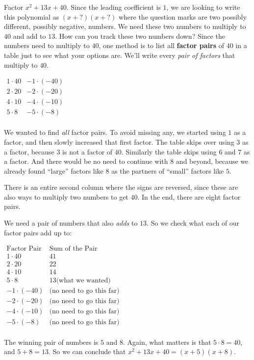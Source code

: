\documentclass{ximera}
\begin{document}
\begin{example}
       Factor $x^2+13x+40$.
        Since the leading coefficient is $1$,
        we are looking to write this polynomial as
        $(x+\mathord{?})(x+\mathord{?})$ where the question marks are two possibly different,
        possibly negative, numbers.
        We need these two numbers to multiply to $40$ and add to $13$.
        How can you track these two numbers down?
        Since the numbers need to multiply to $40$,
        one method is to list all \textbf{factor pairs}
        of $40$ in a table just to see what your options are.
        We'll write every \textit{pair of factors}
        that multiply to $40$.
\begin{center}
$
\begin{array}{cc}
           1\cdot40 & -1\cdot(-40) \\
          2\cdot20 & -2\cdot(-20) \\
         4\cdot10 & -4\cdot(-10)\\
        5\cdot8 &  -5\cdot(-8) \\
 \end{array}
$
\end{center}
        We wanted to find \textit{all} factor pairs.
        To avoid missing any, we started using $1$ as a factor,
        and then slowly increased that first factor.
        The table skips over using $3$ as a factor,
        because $3$ is not a factor of $40$.
        Similarly the table skips using $6$ and $7$ as a factor.
        And there would be no need to continue with $8$ and beyond,
        because we already found ``large''
        factors like $8$ as the partners of
        ``small'' factors like $5$.

   There is an entire second column where the signs are reversed,
        since these are also ways to multiply two numbers to get $40$.
        In the end, there are eight factor pairs.

        We need a pair of numbers that also \textit{adds} to $13$.
        So we check what each of our factor pairs add up to:
\begin{center}
$
\begin{array}{c|l}
      \text{Factor Pair} & \text{Sum of the Pair} \\
\hline
   1\cdot40 & 41 \\
     2\cdot20 & 22 \\
   4\cdot10 & 14 \\
        5\cdot8 & 13 \text{(what we wanted)} \\
-1\cdot(-40) & \text{(no need to go this far)}\\
         -2\cdot(-20) & \text{(no need to go this far)}\\
 -4\cdot(-10) & \text{(no need to go this far}) \\
-5\cdot(-8) & \text{(no need to go this far)} \\
\end{array}
$
\end{center}
  The winning pair of numbers is $5$ and $8$.
        Again, what matters is that $5\cdot8=40$, and $5+8=13$.
        So we can conclude that $x^2+13x+40=(x+5)(x+8)$.
\end{example}
\end{document}
